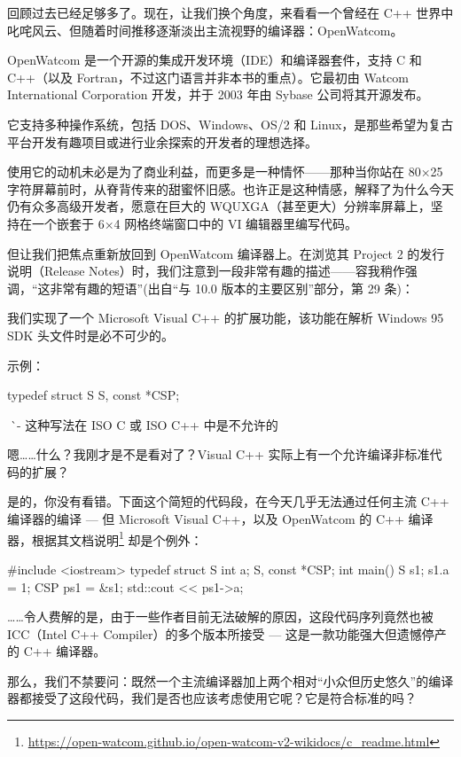 回顾过去已经足够多了。现在，让我们换个角度，来看看一个曾经在 C++ 世界中叱咤风云、但随着时间推移逐渐淡出主流视野的编译器：OpenWatcom。

OpenWatcom 是一个开源的集成开发环境（IDE）和编译器套件，支持 C 和 C++（以及 Fortran，不过这门语言并非本书的重点）。它最初由 Watcom International Corporation 开发，并于 2003 年由 Sybase 公司将其开源发布。

它支持多种操作系统，包括 DOS、Windows、OS/2 和 Linux，是那些希望为复古平台开发有趣项目或进行业余探索的开发者的理想选择。

使用它的动机未必是为了商业利益，而更多是一种情怀——那种当你站在 80×25 字符屏幕前时，从脊背传来的甜蜜怀旧感。也许正是这种情感，解释了为什么今天仍有众多高级开发者，愿意在巨大的 WQUXGA（甚至更大）分辨率屏幕上，坚持在一个嵌套于 6×4 网格终端窗口中的 VI 编辑器里编写代码。

但让我们把焦点重新放回到 OpenWatcom 编译器上。在浏览其 Project 2 的发行说明（Release Notes）时，我们注意到一段非常有趣的描述——容我稍作强调，“这非常有趣的短语”(出自“与 10.0 版本的主要区别”部分，第 29 条)：

\begin{shell}
我们实现了一个 Microsoft Visual C++ 的扩展功能，该功能在解析 Windows 95 SDK 头文件时是必不可少的。

示例：

typedef struct S {
} S, const *CSP;

^^^^^ - 这种写法在 ISO C 或 ISO C++ 中是不允许的
\end{shell}

嗯……什么？我刚才是不是看对了？Visual C++ 实际上有一个允许编译非标准代码的扩展？

是的，你没有看错。下面这个简短的代码段，在今天几乎无法通过任何主流 C++ 编译器的编译 --- 但 Microsoft Visual C++，以及 OpenWatcom 的 C++ 编译器，根据其文档说明\footnote{\url{https://open-watcom.github.io/open-watcom-v2-wikidocs/c_readme.html}} 却是个例外：

\begin{cpp}
#include <iostream>
typedef struct S {
  int a;
} S, const *CSP;
int main() {
  S s1; s1.a = 1;
  CSP ps1 = &s1;
  std::cout << ps1->a;
}
\end{cpp}

……令人费解的是，由于一些作者目前无法破解的原因，这段代码序列竟然也被 ICC（Intel C++ Compiler）的多个版本所接受 --- 这是一款功能强大但遗憾停产的 C++ 编译器。

那么，我们不禁要问：既然一个主流编译器加上两个相对“小众但历史悠久”的编译器都接受了这段代码，我们是否也应该考虑使用它呢？它是符合标准的吗？

